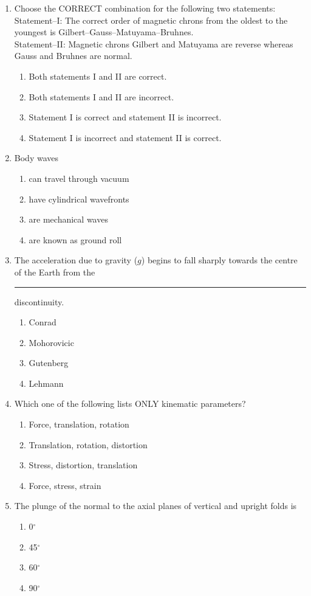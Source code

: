 \documentclass[journal,12pt,onecolumn]{IEEEtran}
\theoremstyle{remark}
\begin{document}
\begin{enumerate}[resume]
\item Choose the CORRECT combination for the following two statements:  \\
Statement--I: The correct order of magnetic chrons from the oldest to the youngest is Gilbert--Gauss--Matuyama--Bruhnes.  \\
Statement--II: Magnetic chrons Gilbert and Matuyama are reverse whereas Gauss and Bruhnes are normal.  
\begin{enumerate}
\item Both statements I and II are correct.
\item Both statements I and II are incorrect.
\item Statement I is correct and statement II is incorrect.
\item Statement I is incorrect and statement II is correct.
\end{enumerate}

\item Body waves  
\begin{enumerate}
\item can travel through vacuum
\item have cylindrical wavefronts
\item are mechanical waves
\item are known as ground roll
\end{enumerate}

\item The acceleration due to gravity ($g$) begins to fall sharply towards the centre of the Earth from the \rule{2cm}{0.15mm} discontinuity.  
\begin{enumerate}
\item Conrad
\item Mohorovicic
\item Gutenberg
\item Lehmann
\end{enumerate}

\item Which one of the following lists ONLY kinematic parameters?  
\begin{enumerate}
\item Force, translation, rotation
\item Translation, rotation, distortion
\item Stress, distortion, translation
\item Force, stress, strain
\end{enumerate}

\item The plunge of the normal to the axial planes of vertical and upright folds is  
\begin{multicols}{4}
\begin{enumerate}
\item 0$^\circ$
\item 45$^\circ$
\item 60$^\circ$
\item 90$^\circ$
\end{enumerate}
\end{multicols}


\end{enumerate}
\end{document}
